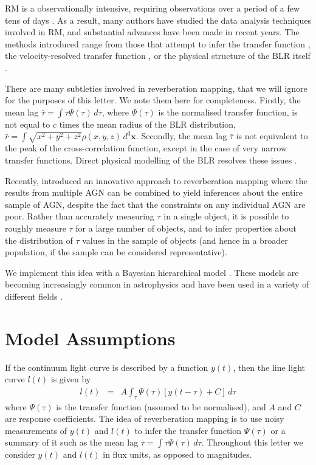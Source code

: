 \documentclass[useAMS,usenatbib]{mn2e}
\begin{document}
RM is a observationally intensive, requiring observations over a period of
a few tens of days \citep{2013ApJ...769..128B}. As a result, many authors have
studied the data analysis techniques involved in RM, and substantial
advances have been made in recent years.
The methods introduced range from those that attempt to infer the
transfer function \citep[the distribution of lags in a single object,
e.g.][]{1995ApJ...440..166K, 2011ApJ...735...80Z},
the velocity-resolved transfer function
\citep{2010ApJ...720L..46B}, or the physical structure of the BLR itself
\citep{pancoast, arp151, pancoast2, 2013arXiv1310.3907L}.

There are many subtleties involved in reverberation mapping, that we will ignore
for the purposes of this letter. We note them here for completeness. Firstly,
the mean lag $\bar{\tau} = \int \tau\Psi(\tau)\, d\tau$, where $\Psi(\tau)$
is the normalised transfer function, is not equal to $c$ times the mean radius of the BLR
distribution, $\bar{r} = \int \sqrt{x^2+y^2+z^2}\rho(x, y, z)\, d^3 \mathbf{x}$.
Secondly, the mean lag $\bar{\tau}$ is not equivalent to the peak of the
cross-correlation function, except in the case of very narrow
transfer functions. Direct physical modelling of the BLR resolves these
issues \citep{pancoast, arp151}.

Recently, \citet{2012MNRAS.427.2701F, 2013MNRAS.434L..16F} introduced an
innovative approach to reverberation mapping where the results from multiple
AGN can be combined to yield inferences about the entire sample of AGN,
despite the fact that the constraints on any individual AGN are poor. Rather
than accurately measuring $\tau$ in a single object, it is possible to roughly
measure $\tau$ for a large number of objects, and to infer properties about
the distribution of $\tau$ values in the sample of objects (and hence in
a broader population, if the sample can be considered representative).

We implement this idea with a Bayesian hierarchical model
\citep{2012arXiv1208.3036L}.
These models are becoming increasingly common in astrophysics and have been
used in a variety of different fields
\citep[e.g.][]{extreme_deconvolution, loredo, kelly, 2013arXiv1310.5177B, 2013AJ....146....7B}.

\section{Model Assumptions}

If the continuum light curve is described by a function $y(t)$, then the line
light curve $l(t)$ is given by
\begin{eqnarray}
l(t) &=& A \int_\tau \Psi(\tau)\left[y(t - \tau) + C\right] \, d\tau
\end{eqnarray}
where $\Psi(\tau)$ is the transfer function (assumed to be normalised),
and $A$ and $C$ are response
coefficients. The idea of reverberation mapping is to use noisy measurements
of $y(t)$ and $l(t)$ to infer the transfer function $\Psi(\tau)$ or a summary
of it such as the mean lag $\bar{\tau} = \int \tau\Psi(\tau) \, d\tau$.
Throughout this letter we consider $y(t)$ and $l(t)$ in flux
units, as opposed to magnitudes.
\end{document}
